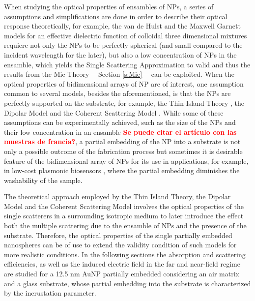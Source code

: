 
When studying the optical properties of ensambles of NPs, a series of assumptions and simplifications are done in order to describe their optical response theoretically, for example, the van de Hulst  \cite{hulst_light_1981} and the Maxwell Garnett \cite{sihvola_electromagnetic_2008} models for an effective dielectric function of colloidal three dimensional mixtures requiere not only the NPs to be perfectly spherical (and small compared to the incident wavelength for the later), but also a low concentration of NPs in the ensamble, which yields the Single Scattering Approximation to valid and thus the results from the Mie Theory ---Section \ref{s:Mie}--- can be exploited. When the optical properties of bidimensional arrays of NP are of interest, one assumption common to several models, besides the aforementioned, is that the NPs are  perfectly supported on the substrate, for example, the Thin Island Theory \cite{bedeaux_optical_2004}, the Dipolar Model \cite{barrera1991optical} and the Coherent Scattering Model \cite{garcia2012multiple}. While some of these assumptions can be experimentally achieved, such as the size of the NPs and their low concentration in an ensamble \textcolor{red}{\textbf{Se puede citar el artículo con las muestras de francia?}}, a partial embedding of the NP into a substrate is not only a possible outcome of the fabrication process \cite{meng_anisotropic_2015} but sometimes it is desirable feature of the bidimensional array of NPs for its use in applications, for example, in low-cost plasmonic biosensors \cite{moirangthem_enhanced_2012}, where the partial embedding diminishes the washability of the sample.

The theoretical approach employed by the Thin Island Theory, the Dipolar Model and the Coherent Scattering Model involves the optical properties of the single scatterers in a surrounding isotropic medium to later introduce the effect both the multiple scattering due to the ensamble of NPs and the presence of the substrate. Therefore, the optical properties of the single partially embedded nanospheres can be of use to extend the validity condition of such models for more realistic conditions. In the following sections the absorption and scattering efficiencies, as well as the induced electric field in the far and near-field regime are studied for a 12.5 nm AuNP partially embedded considering an air matrix and a glass substrate, whose partial embedding into the substrate is characterized by the incrustation parameter.
